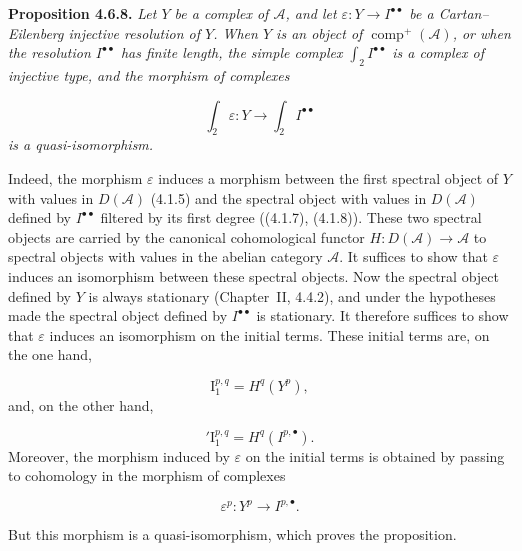 \clearpage
{}%
\begingroup\small\setlength{\parskip}{0pt}\setlength{\emergencystretch}{1.5em}
\setlength{\abovedisplayskip}{4pt plus 2pt minus 2pt}%
\setlength{\belowdisplayskip}{4pt plus 2pt minus 2pt}%

\noindent\textbf{Proposition 4.6.8.}\quad
\textit{Let $Y$ be a complex of $\mathcal A$, and let
$\varepsilon\colon Y\longrightarrow I^{\bullet\bullet}$ be a
Cartan--Eilenberg injective resolution of $Y$. When $Y$ is an object of
$\operatorname{comp}^{+}(\mathcal A)$, or when the resolution
$I^{\bullet\bullet}$ has finite length, the simple complex
$\int_2 I^{\bullet\bullet}$ is a complex of injective type, and the
morphism of complexes}

\[
\textit{$\int_2\varepsilon\colon
Y\longrightarrow\int_2 I^{\bullet\bullet}$}
\]
\textit{is a quasi-isomorphism.}

Indeed, the morphism $\varepsilon$ induces a morphism between the first
spectral object of $Y$ with values in $D(\mathcal A)$ (4.1.5) and the
spectral object with values in $D(\mathcal A)$ defined by
$I^{\bullet\bullet}$ filtered by its first degree ((4.1.7), (4.1.8)).
These two spectral objects are carried by the canonical cohomological
functor
$H\colon D(\mathcal A)\longrightarrow\mathcal A$ to spectral objects with
values in the abelian category $\mathcal A$. It suffices to show that
$\varepsilon$ induces an isomorphism between these spectral objects. Now
the spectral object defined by $Y$ is always stationary (Chapter~II,
4.4.2), and under the hypotheses made the spectral object defined by
$I^{\bullet\bullet}$ is stationary. It therefore suffices to show that
$\varepsilon$ induces an isomorphism on the initial terms. These initial
terms are, on the one hand,

\[
\mathrm I_1^{p,q}=H^q(Y^p),
\]
and, on the other hand,

\[
{}'\mathrm I_1^{p,q}=H^q(I^{p,\bullet}).
\]
Moreover, the morphism induced by $\varepsilon$ on the initial terms is
obtained by passing to cohomology in the morphism of complexes

\[
\varepsilon^p\colon Y^p\longrightarrow I^{p,\bullet}.
\]

But this morphism is a quasi-isomorphism, which proves the proposition.

